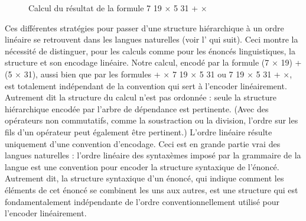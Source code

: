{\begin{figure}[H]
    \caption{Calcul du résultat de la formule  7 19 \textrm{${\times}$} 5 31 + \textrm{${\times}$}\label{fig:formule-calcul2}}
\end{figure}

    Ces différentes stratégies pour passer d’une structure hiérarchique à un ordre linéaire se retrouvent dans les langues naturelles (voir l’ qui suit). Ceci montre la nécessité de distinguer, pour les calculs comme pour les énoncés linguistiques, la structure et son encodage linéaire. Notre calcul, encodé par la formule (7 \textrm{${\times}$} 19) + (5 \textrm{${\times}$} 31), aussi bien que par les formules + \textrm{${\times}$} 7 19 \textrm{${\times}$} 5 31 ou 7 19 \textrm{${\times}$} 5 31 + \textrm{${\times}$}, est totalement indépendant de la convention qui sert à l’encoder linéairement. Autrement dit la structure du calcul n’est pas ordonnée : seule la structure hiérarchique encodée par l’arbre de dépendance est pertinente. (Avec des opérateurs non commutatifs, comme la soustraction ou la division, l’ordre sur les fils d’un opérateur peut également être pertinent.) L’ordre linéaire résulte uniquement d’une convention d’encodage. Ceci est en grande partie vrai des langues naturelles : l’ordre linéaire des syntaxèmes imposé par la grammaire de la langue est une convention pour encoder la structure syntaxique de l’énoncé. Autrement dit, la structure syntaxique d’un énoncé, qui indique comment les éléments de cet énoncé se combinent les uns aux autres, est une structure qui est fondamentalement indépendante de l’ordre conventionnellement utilisé pour l’encoder linéairement.
}
